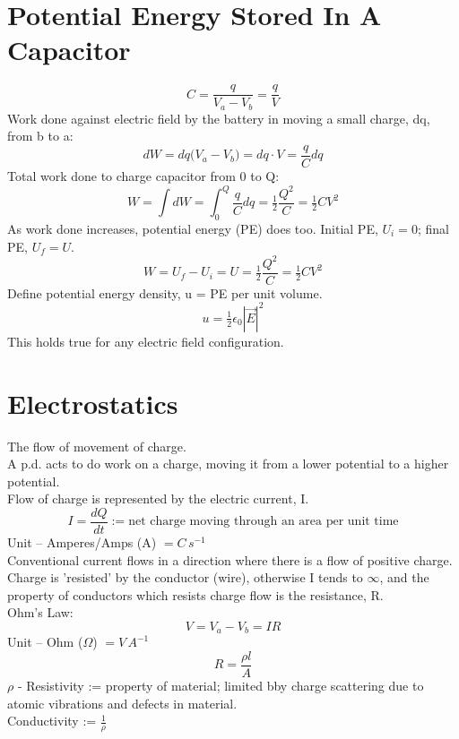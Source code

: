 \documentclass[a4paper, 11pt, fleqn, normalem]{report}
\begin{document}
\section{Potential Energy Stored In A Capacitor}
\begin{equation*}
    C = \frac{q}{V_{a} - V_{b}} = \frac{q}{V}
\end{equation*}
Work done against electric field by the battery in moving a small charge, dq, from b to a:
\begin{equation*}
    dW = dq\big(V_{a} - V_{b}\big) = dq \cdot V = \frac{q}{C}dq
\end{equation*}
Total work done to charge capacitor from 0 to Q:
\begin{equation*}
    W = \int dW = \int_{0}^{Q} \frac{q}{C} dq = \tfrac{1}{2} \frac{Q^{2}}{C} = \tfrac{1}{2}CV^{2}
\end{equation*}
As work done increases, potential energy (PE) does too. Initial PE, $U_{i} = 0$; final PE, $U_{f} = U$.
\begin{equation*}
    W = U_{f} - U_{i} = U = \tfrac{1}{2}\frac{Q^{2}}{C} = \tfrac{1}{2}CV^{2}
\end{equation*}
Define potential energy density, u = PE per unit volume.
\begin{equation*}
    u = \tfrac{1}{2}\epsilon_{0}|\vec{E}|^{2}
\end{equation*}
This holds true for any electric field configuration.

\section{Electrostatics}
The flow of movement of charge. \\
A p.d. acts to do work on a charge, moving it from a lower potential to a higher potential. \\
Flow of charge is represented by the electric current, I.
\begin{equation*}
    I = \frac{dQ}{dt} := \text{net charge moving through an area per unit time}
\end{equation*}
Unit -- Amperes/Amps (A) $= C\,s^{-1}$ \\
Conventional current flows in a direction where there is a flow of positive charge. \\
Charge is 'resisted' by the conductor (wire), otherwise I tends to $\infty$, and the property of conductors which resists charge flow is the resistance, R. \\
Ohm's Law:
\begin{equation*}
    V = V_{a} - V_{b} = IR
\end{equation*}
Unit -- Ohm ($\Omega$) $= V\,A^{-1}$
\begin{equation*}
    R = \frac{\rho l}{A}
\end{equation*}
$\rho$ - Resistivity := property of material; limited bby charge scattering due to atomic vibrations and defects in material. \\
Conductivity := $\frac{1}{\rho}$
\end{document}
